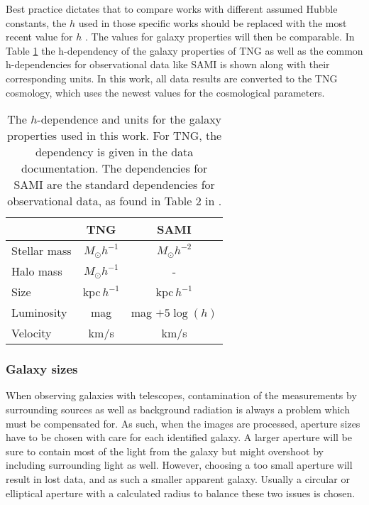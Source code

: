 Best practice dictates that to compare works with different assumed Hubble constants, the $h$ used in those specific works should be replaced with the most recent value for $h$ \parencite{Croton2013}. The values for galaxy properties will then be comparable. In Table \ref{h_dependence} the h-dependency of the galaxy properties of TNG as well as the common h-dependencies for observational data like SAMI is shown along with their corresponding units. In this work, all data results are converted to the TNG cosmology, which uses the newest values for the cosmological parameters.

\begin{table}
\begin{center}
\caption{The $h$-dependence and units for the galaxy properties used in this work. For TNG, the dependency is given in the data documentation. The dependencies for SAMI are the standard dependencies for observational data, as found in Table 2 in \textcite{Croton2013}.}
\label{h_dependence}
\begin{tabular}{ l| c c }
 \hline
 \hline
   & TNG & SAMI \\
 \hline
 Stellar mass & $M_{\odot}h^{-1}$ & $M_{\odot}h^{-2}$ \\ 
 Halo mass & $M_{\odot}h^{-1}$ & - \\
 Size & kpc$\,h^{-1}$ & kpc$\,h^{-1}$ \\
 Luminosity & mag & mag $+5\log(h)$ \\
 Velocity & km/s & km/s  \\ 

 \hline 
\end{tabular}
\end{center}
\end{table}

\subsubsection{Galaxy sizes} \label{galaxy_size}
When observing galaxies with telescopes, contamination of the measurements by surrounding sources as well as background radiation is always a problem which must be compensated for. As such, when the images are processed, aperture sizes have to be chosen with care for each identified galaxy. A larger aperture will be sure to contain most of the light from the galaxy but might overshoot by including surrounding light as well. However, choosing a too small aperture will result in lost data, and as such a smaller apparent galaxy. Usually a circular or elliptical aperture with a calculated radius to balance these two issues is chosen.

